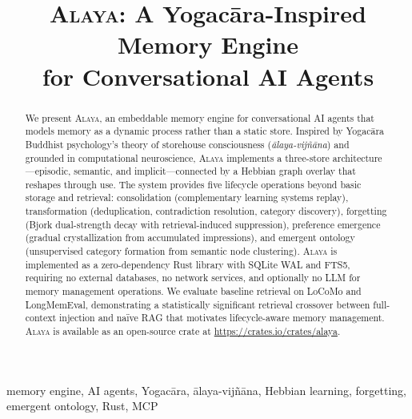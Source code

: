 \documentclass[conference]{IEEEtran}
\newcommand{\sys}[1]{\textsc{#1}}
\newcommand{\alaya}{\sys{Alaya}}
\begin{document}
\title{\alaya{}: A Yogac\=ara-Inspired Memory Engine\\for Conversational AI Agents}

\author{
}

\maketitle
\pagestyle{plain}

\begin{abstract}
We present \alaya{}, an embeddable memory engine for conversational AI
agents that models memory as a dynamic process rather than a static store.
Inspired by Yogac\=ara Buddhist psychology's theory of storehouse
consciousness (\emph{\=alaya-vij\~n\=ana}) and grounded in computational
neuroscience, \alaya{} implements a three-store architecture---episodic,
semantic, and implicit---connected by a Hebbian graph overlay that reshapes
through use. The system provides five lifecycle operations beyond basic
storage and retrieval: consolidation (complementary learning systems
replay), transformation (deduplication, contradiction resolution, category
discovery), forgetting (Bjork dual-strength decay with retrieval-induced
suppression), preference emergence (gradual crystallization from accumulated
impressions), and emergent ontology (unsupervised category formation from
semantic node clustering). \alaya{} is implemented as a zero-dependency Rust
library with SQLite WAL and FTS5, requiring no external databases, no
network services, and optionally no LLM for memory management operations.
We evaluate baseline retrieval on LoCoMo and LongMemEval, demonstrating a
statistically significant retrieval crossover between full-context injection
and na\"ive RAG that motivates lifecycle-aware memory management. \alaya{}
is available as an open-source crate at
\url{https://crates.io/crates/alaya}.
\end{abstract}

\begin{IEEEkeywords}
memory engine, AI agents, Yogac\=ara, \=alaya-vij\~n\=ana, Hebbian
learning, forgetting, emergent ontology, Rust, MCP
\end{IEEEkeywords}










\def\UrlBreaks{\do\/\do-\do.\do=\do_\do?\do&\do\%\do\#\do\~}


\end{document}
